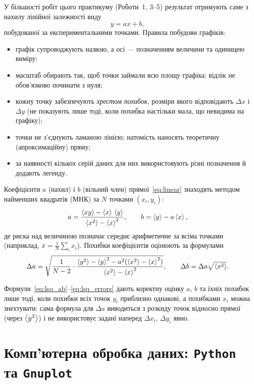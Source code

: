 У більшості робіт цього практикуму (Роботи~1, 3--5) результат
отримують саме з нахилу лінійної залежності виду
\begin{equation}\label{eq:linear}
	y = a x + b,
\end{equation}
побудованої за експериментальними точками. Правила побудови графіків:
\begin{itemize}
	\item графік супроводжують назвою, а осі --- позначенням величини
	та одиницею виміру;
	\item масштаб обирають так, щоб точки займали всю площу графіка;
	відлік не обов'язково починати з нуля;
	\item кожну точку забезпечують \emph{хрестом похибок}, розміри
	якого відповідають $\Delta x$ і $\Delta y$ (не показують лише
	тоді, коли похибка настільки мала, що невидима на графіку);
	\item точки не з'єднують ламаною лінією; натомість наносять
	теоретичну (апроксимаційну) пряму;
	\item за наявності кількох серій даних для них використовують різні
	позначення й додають легенду.
\end{itemize}

Коефіцієнти $a$ (нахил) і $b$ (вільний член) прямої~\eqref{eq:linear}
знаходять методом найменших квадратів (МНК) за $N$ точками
$(x_i, y_i)$:
\begin{equation}\label{eq:lsq_ab}
	a = \frac{\left\langle xy \right\rangle - \left\langle x \right\rangle\,\left\langle y \right\rangle}{\left\langle x^2 \right\rangle - \left\langle x \right\rangle^2}, \qquad
	b = \left\langle y \right\rangle - a\left\langle x \right\rangle,
\end{equation}
де риска над величиною позначає середнє арифметичне за всіма точками
(наприклад, $\bar{x} = \frac{1}{N}\sum_i x_i$). Похибки коефіцієнтів
оцінюють за формулами
\begin{equation}\label{eq:lsq_errors}
	\Delta a = \sqrt{\frac{1}{N-2}\cdot\frac{\left\langle y^2 \right\rangle - \left\langle y \right\rangle^2 - a^2(\left\langle x^2 \right\rangle-\left\langle x \right\rangle^2)}{\left\langle x^2 \right\rangle-\left\langle x \right\rangle^2}}, \qquad
	\Delta b = \Delta a \sqrt{\left\langle x^2 \right\rangle}.
\end{equation}

Формули~\eqref{eq:lsq_ab}--\eqref{eq:lsq_errors} дають коректну оцінку
$a$, $b$ та їхніх похибок лише тоді, коли похибки всіх точок $y_i$
приблизно однакові, а похибками $x_i$ можна знехтувати: сама формула
для $\Delta a$ виводиться з розкиду точок відносно прямої (через
$\left\langle y^2 \right\rangle$) і не використовує задані наперед $\Delta x_i$,
$\Delta y_i$ явно.

\section{Комп'ютерна обробка даних: \texttt{Python} та \texttt{Gnuplot}}
\label{sec:computer}

